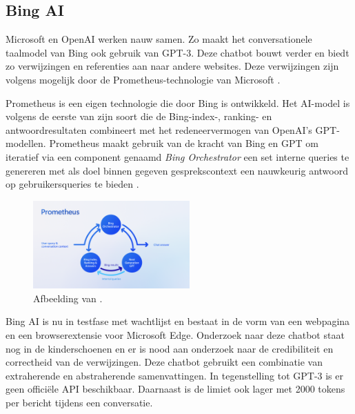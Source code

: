 \subsection{Bing AI}

Microsoft en OpenAI werken nauw samen. Zo maakt het conversationele taalmodel van Bing ook gebruik van GPT-3. Deze chatbot bouwt verder en biedt zo verwijzingen en referenties aan naar andere websites. Deze verwijzingen zijn volgens mogelijk door de Prometheus-technologie van Microsoft \autocite{Ribas2023}.

Prometheus is een eigen technologie die door Bing is ontwikkeld. Het AI-model is volgens \textcite{Ribas2023} de eerste van zijn soort die de Bing-index-, ranking- en antwoordresultaten combineert met het redeneervermogen van OpenAI’s GPT-modellen. Prometheus maakt gebruik van de kracht van Bing en GPT om iteratief via een component genaamd \textit{Bing Orchestrator} een set interne queries te genereren met als doel binnen gegeven gesprekscontext een nauwkeurig antwoord op gebruikersqueries te bieden \autocite{Ribas2023}.

\begin{figure}[H]
	\includegraphics[width=6cm]{img/bing-ai-prometheus.png}
	\caption{Afbeelding van \textcite{Ribas2023}.}
\end{figure}

Bing AI is nu in testfase met wachtlijst en bestaat in de vorm van een webpagina en een browserextensie voor Microsoft Edge. Onderzoek naar deze chatbot staat nog in de kinderschoenen en er is nood aan onderzoek naar de credibiliteit en correctheid van de verwijzingen. Deze chatbot gebruikt een combinatie van extraherende en abstraherende samenvattingen. In tegenstelling tot GPT-3 is er geen officiële API beschikbaar. Daarnaast is de limiet ook lager met 2000 tokens per bericht tijdens een conversatie. 

